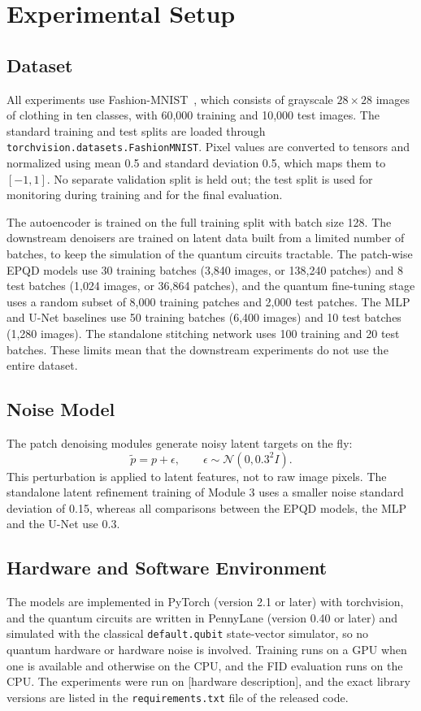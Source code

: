 \section{Experimental Setup}\label{sec:setup}

\subsection{Dataset}
All experiments use Fashion-MNIST~\cite{fmnist}, which consists of grayscale $28\times28$ images of clothing in ten classes, with 60{,}000 training and 10{,}000 test images. The standard training and test splits are loaded through \texttt{torchvision.datasets.FashionMNIST}. Pixel values are converted to tensors and normalized using mean 0.5 and standard deviation 0.5, which maps them to $[-1,1]$. No separate validation split is held out; the test split is used for monitoring during training and for the final evaluation.

The autoencoder is trained on the full training split with batch size 128. The downstream denoisers are trained on latent data built from a limited number of batches, to keep the simulation of the quantum circuits tractable. The patch-wise EPQD models use 30 training batches (3{,}840 images, or 138{,}240 patches) and 8 test batches (1{,}024 images, or 36{,}864 patches), and the quantum fine-tuning stage uses a random subset of 8{,}000 training patches and 2{,}000 test patches. The MLP and U-Net baselines use 50 training batches (6{,}400 images) and 10 test batches (1{,}280 images). The standalone stitching network uses 100 training and 20 test batches. These limits mean that the downstream experiments do not use the entire dataset.

\subsection{Noise Model}
The patch denoising modules generate noisy latent targets on the fly:
\begin{equation}
    \tilde p=p+\epsilon,\qquad \epsilon\sim\mathcal{N}(0,0.3^2I).
\end{equation}
This perturbation is applied to latent features, not to raw image pixels. The standalone latent refinement training of Module 3 uses a smaller noise standard deviation of 0.15, whereas all comparisons between the EPQD models, the MLP and the U-Net use 0.3.

\subsection{Hardware and Software Environment}
The models are implemented in PyTorch (version 2.1 or later) with torchvision, and the quantum circuits are written in PennyLane (version 0.40 or later) and simulated with the classical \texttt{default.qubit} state-vector simulator, so no quantum hardware or hardware noise is involved. Training runs on a GPU when one is available and otherwise on the CPU, and the FID evaluation runs on the CPU. The experiments were run on [hardware description], and the exact library versions are listed in the \texttt{requirements.txt} file of the released code.

